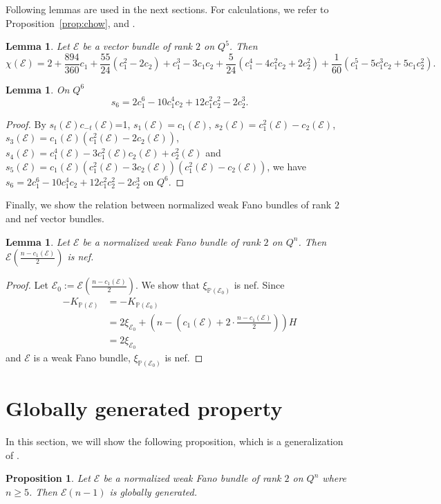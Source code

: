 \documentclass{amsproc}
\newtheorem{lemma}[theorem]{Lemma}
\newtheorem{proposition}[theorem]{Proposition}
\theoremstyle{definition}
\def\P{{\mathbb P}}
\def\cE{{\mathcal E}}
\begin{document}
Following lemmas are used in the next sections. For calculations, we refer to Proposition~\ref{prop:chow}, \cite[Theorem~4.1 of Appendix~A]{H77} and \cite{F98}.

\begin{lemma}\label{lem:5RR}
Let $\cE$ be a vector bundle of rank $2$ on $Q^5$. Then
$$
\chi(\cE)= 2 +\frac{894}{360}c_1 +\frac{55}{24}(c_1^2
 -2c_2)+c_1^3-3c_1c_2+\frac{5}{24}(c_1^4-4c_1^2c_2+2c_2^2)+\frac{1}{60}(c_1^5-5c_1^3c_2+5c_1c_2^2).
$$
\end{lemma}

\begin{lemma}\label{lem:segre}
On $Q^6$
$$
s_6=2c_1^6-10c_1^4c_2+12c_1^2c_2^2-2c_2^3.
$$
\end{lemma}

\begin{proof}
By $s_t(\cE)c_{-t}(\cE)$=1, $s_1(\cE)=c_1(\cE)$, $s_2(\cE)=c_1^2(\cE)-c_2(\cE)$, $s_3(\cE)=c_1(\cE)(c_1^2(\cE)-2c_2(\cE))$, $s_4(\cE)=c_1^4(\cE)-3c_1^2(\cE)c_2(\cE)+c_2^2(\cE)$ and $s_5(\cE)=c_1(\cE)(c_1^2(\cE)-3c_2(\cE))(c_1^2(\cE)-c_2(\cE))$, we have $s_6=2c_1^6-10c_1^4c_2+12c_1^2c_2^2-2c_2^3$ on $Q^6$.
\end{proof}

Finally, we show the relation between normalized weak Fano bundles of rank $2$ and nef vector bundles.
\begin{lemma}\label{lem:n-c1-nef}
Let $\cE$ be a normalized weak Fano bundle of rank $2$ on $Q^n$. Then $\cE\left(\frac{n-c_1(\cE)}{2}\right)$ is nef.
\end{lemma}

\begin{proof}
Let $\cE_0:= \cE\left(\frac{n-c_1(\cE)}{2}\right)$. We show that $\xi_{\mathbb{P}(\cE_0)}$ is nef. Since 
\begin{align*}
-K_{\mathbb{P}(\cE)}&=-K_{\mathbb{P}\left(\cE_0\right)}\\
&= 2\xi_{\cE_0}+\left(n-\left(c_1(\cE)+2\cdot \frac{n-c_1(\cE)}{2}\right)\right)H\\
&= 2\xi_{\cE_0}
\end{align*}
and $\cE$ is a weak Fano bundle, $\xi_{\P\left(\cE_0\right)}$ is nef.
\end{proof}

\section{Globally generated property}

In this section, we will show the following proposition, which is a generalization of \cite[Proposition~2.7]{APW94}. 
\begin{proposition}\label{prop:gbgs}
Let $\cE$ be a normalized weak Fano bundle of rank $2$ on $Q^n$ where $n\ge 5$. Then $\cE(n-1)$ is globally generated.
\end{proposition}
\end{document}
